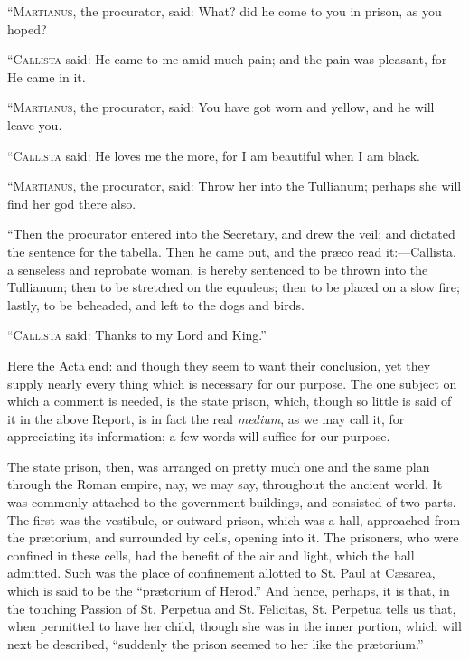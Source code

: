 ``M\textsc{artianus}, the procurator, said: What? did he come to you in
prison, as you hoped?

``C\textsc{allista} said: He came to me amid much pain; and the pain was
pleasant, for He came in it.

``M\textsc{artianus}, the procurator, said: You have got worn and
yellow, and he will leave you.

``C\textsc{allista} said: He loves me the more, for I am beautiful when
I am black.

``M\textsc{artianus}, the procurator, said: Throw her into the Tullianum;
perhaps she will find her god there also.

``Then the procurator entered into the Secretary, and drew the
veil; and dictated the sentence for the tabella. Then he came out, and
the præco read it:—Callista, a senseless and reprobate woman, is
hereby sentenced to be thrown into the Tullianum; then to be stretched
on the equuleus; then to be placed on a slow fire; lastly, to be
beheaded, and left to the dogs and birds.

``C\textsc{allista} said: Thanks to my Lord and King.''

Here the Acta end: and though they seem to want their conclusion,
yet they supply nearly every thing which is necessary for our purpose.
The one subject on which a comment is needed, is the state prison,
which, though so little is said of it in the above Report, is in
fact the real \emph{medium}, as we may call it, for appreciating its
information; a few words will suffice for our purpose.

The state prison, then, was arranged on pretty much one and the
same plan through the Roman empire, nay, we may say, throughout the
ancient world. It was commonly attached to the government buildings,
and consisted of two parts. The first was the vestibule, or outward
prison, which was a hall, approached from the prætorium, and
surrounded by cells, opening into it. The prisoners, who were confined
in these cells, had the benefit of the air and light, which the hall
admitted. Such was the place of confinement allotted to St. Paul at
Cæsarea, which is said to be the ``prætorium of Herod.'' And
hence, perhaps, it is that, in the touching Passion of St. Perpetua
and St. Felicitas, St. Perpetua tells us that, when permitted to have
her child, though she was in the inner portion, which will next be
described, ``suddenly the prison seemed to her like the prætorium.''


